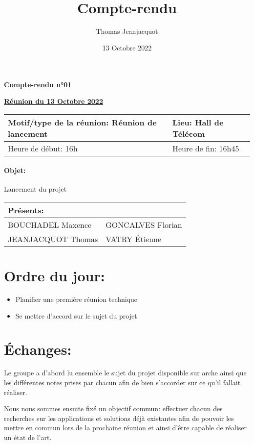 \documentclass[french, 12pt]{article}
\author{Thomas Jeanjacquot}
\date{13 Octobre 2022}
\title{Compte-rendu }
\begin{document}
\begin{center}
\large{ \textbf{Compte-rendu n°01}


\underline{\textbf{Réunion du 13 Octobre 2022}} \\
\bigskip}

\begin{tabular}{|L{8cm}|L{8cm}|}
\hline Motif/type de la réunion: Réunion de lancement & Lieu: Hall de Télécom \\
\hline Heure de début: 16h & Heure de fin: 16h45 \\
\hline

\end{tabular}

\end{center}


\paragraph{Objet:}
Lancement du projet

\bigskip
\noindent
\begin{tabular}{|L{8cm} L{8cm}|}
\hline Présents: & \\
\hline
BOUCHADEL Maxence & GONCALVES Florian \\
JEANJACQUOT Thomas & VATRY Étienne\\
\hline

\end{tabular}

\section*{Ordre du jour:}
\begin{itemize}
    \item Planifier une première réunion technique
    \item Se mettre d'accord sur le sujet du projet
\end{itemize}


\section*{Échanges:}
Le groupe a d'abord lu ensemble le sujet du projet disponible sur arche ainsi que les différentes notes prises par chacun afin de bien s'accorder sur ce qu'il fallait réaliser.

Nous nous sommes ensuite fixé un objectif commun: effectuer chacun des recherches sur les applications et solutions déjà existantes afin de pouvoir les mettre en commun lors de la prochaine réunion et ainsi d'être capable de réaliser un état de l'art.
\end{document}
